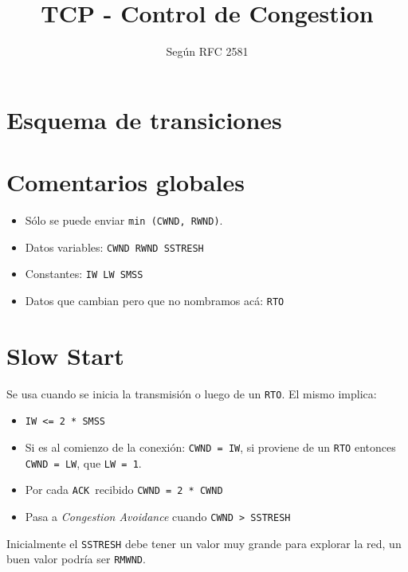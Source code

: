 \documentclass[a4paper,10pt]{article}
\title{TCP - Control de Congestion}
\author{Según RFC 2581}
\date{}
\def\ack{\texttt{ACK}\ }
\newcommand\cmd[1]{\texttt{#1}}
\begin{document}
\maketitle

\section*{Esquema de transiciones}


\section*{Comentarios globales}
\begin{itemize}
	\item Sólo se puede enviar \texttt{min (CWND, RWND)}.
	\item Datos variables: \cmd{CWND RWND SSTRESH}
	\item Constantes: \cmd{IW LW SMSS}
	\item Datos que cambian pero que no nombramos acá: \cmd{RTO}
\end{itemize}


\section*{Slow Start}
Se usa cuando se inicia la transmisión o luego de un \cmd{RTO}. El mismo
implica:
\begin{itemize}
	\item \cmd{IW <= 2 * SMSS}
	\item Si es al comienzo de la conexión: \cmd{CWND = IW}, si proviene de un
		\cmd{RTO} entonces \cmd{CWND = LW}, que \cmd{LW = 1}.
	\item Por cada \ack recibido \cmd{CWND = 2 * CWND}
	\item Pasa a \emph{Congestion Avoidance} cuando \cmd{CWND > SSTRESH}		
\end{itemize}
Inicialmente el \cmd{SSTRESH} debe tener un valor muy grande para explorar la
red, un buen valor podría ser \cmd{RMWND}.
\end{document}
